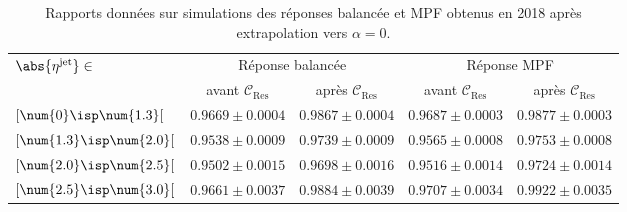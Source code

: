 \begin{table}[h]
\centering
\begin{tabular}{lcccc}
\toprule
\multirow{2}{*}{$\abs{\eta^\text{jet}}\in$} & \multicolumn{2}{c}{Réponse balancée} & \multicolumn{2}{c}{Réponse MPF} \\
\cmidrule(lr){2-3}\cmidrule(lr){4-5}
 & avant $\mathcal{C}_\text{Res}$ & après $\mathcal{C}_\text{Res}$ & avant $\mathcal{C}_\text{Res}$ & après $\mathcal{C}_\text{Res}$ \\
\midrule
$[\num{0}\isp \num{1.3}[$ & $\num{0.9669}\pm\num{0.0004}$ & $\num{0.9867}\pm\num{0.0004}$ & $\num{0.9687}\pm\num{0.0003}$ & $\num{0.9877}\pm\num{0.0003}$ \\
$[\num{1.3}\isp \num{2.0}[$ & $\num{0.9538}\pm\num{0.0009}$ & $\num{0.9739}\pm\num{0.0009}$ & $\num{0.9565}\pm\num{0.0008}$ & $\num{0.9753}\pm\num{0.0008}$ \\
$[\num{2.0}\isp \num{2.5}[$ & $\num{0.9502}\pm\num{0.0015}$ & $\num{0.9698}\pm\num{0.0016}$ & $\num{0.9516}\pm\num{0.0014}$ & $\num{0.9724}\pm\num{0.0014}$ \\
$[\num{2.5}\isp \num{3.0}[$ & $\num{0.9661}\pm\num{0.0037}$ & $\num{0.9884}\pm\num{0.0039}$ & $\num{0.9707}\pm\num{0.0034}$ & $\num{0.9922}\pm\num{0.0035}$ \\
\bottomrule
\end{tabular}
\caption[Rapports des réponses balancée et MPF obtenus en 2018 après extrapolation vers $\alpha=0$.]{Rapports données sur simulations des réponses balancée et MPF obtenus en 2018 après extrapolation vers $\alpha=0$.}
\label{tab-responses_recap_table_L2L3Res_cross_check_2018ABCD}
\end{table}